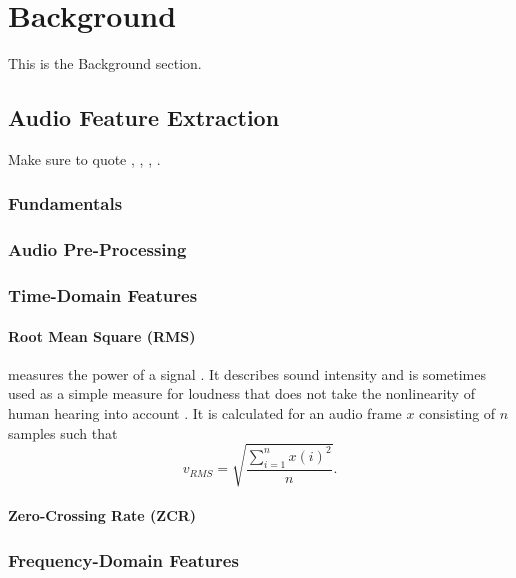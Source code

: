 
\section{Background}
\label{sec:background}
This is the Background section.

\subsection{Audio Feature Extraction}
\label{subsec:feature_extraction}
Make sure to quote \citet{lerch2012}, \citet{rawlinson2015},
\citet{web:meyda2019}, \citet{mathieu2010} \citet{web:yaafe2019}.

\subsubsection{Fundamentals}
\label{subsubsec:feature_fundamentals}

\subsubsection{Audio Pre-Processing}
\label{subsubsec:preprocessing}

\subsubsection{Time-Domain Features}
\label{subsubsec:temporal_features}

\paragraph{Root Mean Square (RMS)}
\label{para:rms}
measures the power of a signal \citep[p.73f]{lerch2012}. It describes sound intensity and is sometimes used as a simple measure for loudness
\citep{web:meyda2019_features} that does not take the nonlinearity of human
hearing into account \citep{fletcher1933}. It is calculated for an audio
frame $x$ consisting of $n$ samples such that
\begin{equation}
  v_{RMS} = \sqrt{ \frac{ \sum_{i=1}^{n} x(i)^2} {n}}.
\end{equation}

\paragraph{Zero-Crossing Rate (ZCR)}
\label{para:zcr}

\subsubsection{Frequency-Domain Features}
\label{subsubsec:spectral_features}

